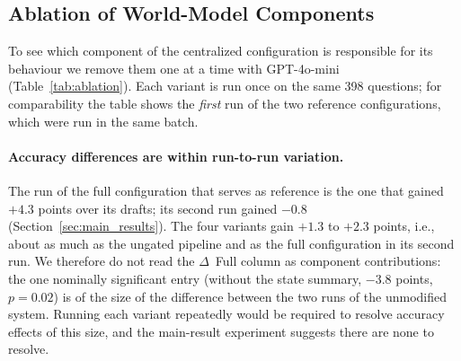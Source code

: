 \subsection{Ablation of World-Model Components}
\label{sec:ablation}

To see which component of the centralized configuration is responsible for its behaviour we remove them one at a time with GPT-4o-mini (Table~\ref{tab:ablation}).
Each variant is run once on the same 398 questions; for comparability the table shows the \emph{first} run of the two reference configurations, which were run in the same batch.

\begin{table}[!t]
\caption{Ablation with GPT-4o-mini (398 questions per row, single run). Columns as in Table~\ref{tab:gate}; $\Delta$ Full: paired difference in final accuracy to the full centralized configuration in the same run (points, $p$ of the paired permutation test in parentheses).}
\label{tab:ablation}
\footnotesize
\setlength{\tabcolsep}{3pt}
\end{table}

\paragraph{Accuracy differences are within run-to-run variation.}
The run of the full configuration that serves as reference is the one that gained \(+4.3\) points over its drafts; its second run gained \(-0.8\) (Section~\ref{sec:main_results}).
The four variants gain \(+1.3\) to \(+2.3\) points, i.e., about as much as the ungated pipeline and as the full configuration in its second run.
We therefore do not read the \(\Delta\)~Full column as component contributions: the one nominally significant entry (without the state summary, \(-3.8\) points, \(p=0.02\)) is of the size of the difference between the two runs of the unmodified system.
Running each variant repeatedly would be required to resolve accuracy effects of this size, and the main-result experiment suggests there are none to resolve.

